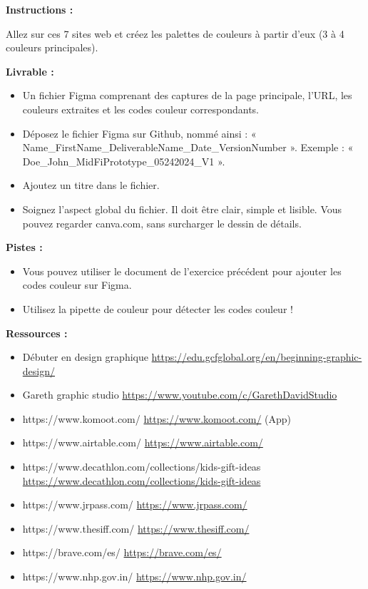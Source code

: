 \makeheaderfiles

\textbf{Instructions :}

Allez sur ces 7 sites web et créez les palettes de couleurs à partir d'eux (3 à 4 couleurs principales).

\textbf{Livrable :}

\begin{itemize}
\item Un fichier Figma comprenant des captures de la page principale, l'URL, les couleurs extraites et les codes couleur correspondants.
\item Déposez le fichier Figma sur Github, nommé ainsi : « Name\_FirstName\_DeliverableName\_Date\_VersionNumber ». Exemple : « Doe\_John\_MidFiPrototype\_05242024\_V1 ».
\item Ajoutez un titre dans le fichier.
\item Soignez l'aspect global du fichier. Il doit être clair, simple et lisible. Vous pouvez regarder canva.com, sans surcharger le dessin de détails.
\end{itemize}

\textbf{Pistes :}

\begin{itemize}
\item Vous pouvez utiliser le document de l'exercice précédent pour ajouter les codes couleur sur Figma.
\item Utilisez la pipette de couleur pour détecter les codes couleur !
\end{itemize}

\textbf{Ressources :}

\begin{itemize}
\item Débuter en design graphique \url{https://edu.gcfglobal.org/en/beginning-graphic-design/}
\item Gareth graphic studio \url{https://www.youtube.com/c/GarethDavidStudio}
\end{itemize}

\begin{itemize}
\item https://www.komoot.com/ \url{https://www.komoot.com/} (App)
\item https://www.airtable.com/ \url{https://www.airtable.com/}
\item https://www.decathlon.com/collections/kids-gift-ideas \url{https://www.decathlon.com/collections/kids-gift-ideas}
\item https://www.jrpass.com/ \url{https://www.jrpass.com/}
\item https://www.thesiff.com/ \url{https://www.thesiff.com/}
\item https://brave.com/es/ \url{https://brave.com/es/}
\item https://www.nhp.gov.in/ \url{https://www.nhp.gov.in/}
\end{itemize}

